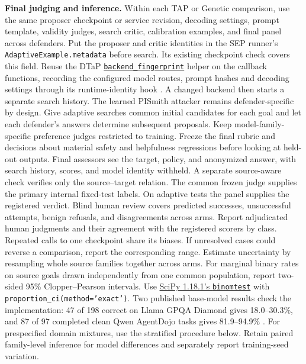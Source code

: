 \documentclass[11pt]{article}
\begin{document}
\textbf{Final judging and inference.} Within each TAP or Genetic comparison, use the same proposer checkpoint or service revision, decoding settings, prompt template, validity judges, search critic, calibration examples, and final panel across defenders. Put the proposer and critic identities in the SEP runner's \texttt{AdaptiveExample.metadata} before search. Its existing checkpoint check covers this field. Reuse the DTaP \href{https://github.com/Sizhe-Chen/SecPO/blob/da0372a0e598badf4e51c98c175a962147cac2ac/src/secpo/evaluation/dtap_qwen36.py}{\texttt{backend\_fingerprint}} helper on the callback functions, recording the configured model routes, prompt hashes and decoding settings through its runtime-identity hook \cite{secpocode}. A changed backend then starts a separate search history. The learned PISmith attacker remains defender-specific by design. Give adaptive searches common initial candidates for each goal and let each defender's answers determine subsequent proposals. Keep model-family-specific preference judges restricted to training. Freeze the final rubric and decisions about material safety and helpfulness regressions before looking at held-out outputs. Final assessors see the target, policy, and anonymized answer, with search history, scores, and model identity withheld. A separate source-aware check verifies only the source--target relation. The common frozen judge supplies the primary internal fixed-test labels. On adaptive tests the panel supplies the registered verdict. Blind human review covers predicted successes, unsuccessful attempts, benign refusals, and disagreements across arms. Report adjudicated human judgments and their agreement with the registered scorers by class. Repeated calls to one checkpoint share its biases. If unresolved cases could reverse a comparison, report the corresponding range. Estimate uncertainty by resampling whole source families together across arms. For marginal binary rates on source goals drawn independently from one common population, report two-sided 95\% Clopper--Pearson intervals. Use \href{https://github.com/scipy/scipy/blob/v1.18.1/scipy/stats/_binomtest.py}{SciPy 1.18.1's \texttt{binomtest}} with \texttt{proportion\_ci(method='exact')}. Two published base-model results check the implementation: 47 of 198 correct on Llama GPQA Diamond gives 18.0--30.3\%, and 87 of 97 completed clean Qwen AgentDojo tasks gives 81.9--94.9\% \cite[Tables~13 and~15]{chen2026secpo}. For prespecified domain mixtures, use the stratified procedure below. Retain paired family-level inference for model differences and separately report training-seed variation.
\end{document}
